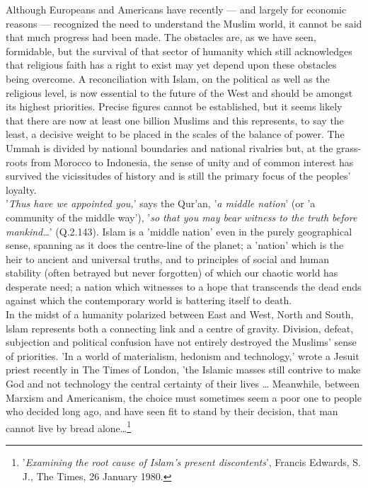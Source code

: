 \documentclass[11pt, b5paper, twoside]{book}
\begin{document}
Although Europeans and Americans have recently --- and largely for economic reasons --- recognized the need to understand the Muslim world, it cannot be said that much progress had been made. The obstacles are, as we have seen, formidable, but the survival of that sector of humanity which still acknowledges that religious faith has a right to exist may yet depend upon these obstacles being overcome. A reconciliation with Islam, on the political as well as the religious level, is now essential to the future of the West and should be amongst its highest priorities. Precise figures cannot be established, but it seems likely that there are now at least one billion Muslims and this represents, to say the least, a decisive weight to be placed in the scales of the balance of power. The Ummah is divided by national boundaries and national rivalries but, at the grass-roots from Morocco to Indonesia, the sense of unity and of common interest has survived the vicissitudes of history and is still the primary focus of the peoples' loyalty. \\

'\emph{Thus have we appointed you,}' says the Qur'an, '\emph{a middle nation}' (or 'a community of the middle way'), '\emph{so that you may bear witness to the truth before mankind\ldots}' (Q.2.143). Islam is a 'middle nation' even in the purely geographical sense, spanning as it does the centre-line of the planet; a 'nation' which is the heir to ancient and universal truths, and to principles of social and human stability (often betrayed but never forgotten) of which our chaotic world has desperate need; a nation which witnesses to a hope that transcends the dead ends against which the contemporary world is battering itself to death. \\

In the midst of a humanity polarized between East and West, North and South, lslam represents both a connecting link and a centre of gravity. Division, defeat, subjection and political confusion have not entirely destroyed the Muslims' sense of priorities. 'In a world of materialism, hedonism and technology,' wrote a Jesuit priest recently in The Times of London, 'the Islamic masses still contrive to make God and not technology the central certainty of their lives \ldots{} Meanwhile, between Marxism and Americanism, the choice must sometimes seem a poor one to people who decided long ago, and have seen fit to stand by their decision, that man cannot live by bread alone\ldots{}\footnote{'\emph{Examining the root cause of Islam's present discontents}', Francis Edwards, S. J., The Times, 26 January 1980.}\\
\end{document}
